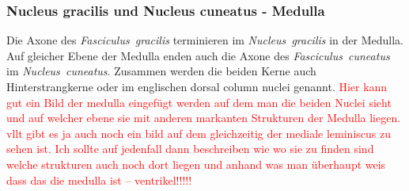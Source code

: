 \documentclass[12pt,a4paper,pdftex]{article}
\begin{document}
\subsubsection*{Nucleus gracilis und Nucleus cuneatus - Medulla}

Die Axone des \textit{Fasciculus~gracilis} terminieren im \textit{Nucleus~gracilis} in der Medulla. Auf gleicher Ebene der Medulla enden auch die Axone des \textit{Fasciculus~cuneatus} im \textit{Nucleus~cuneatus}. Zusammen werden die beiden Kerne auch Hinterstrangkerne oder im englischen dorsal column nuclei genannt. \textcolor{red}{Hier kann gut ein Bild der medulla eingefügt werden auf dem man die beiden Nuclei sieht und auf welcher ebene sie mit anderen markanten Strukturen der Medulla liegen. vllt gibt es ja auch noch ein bild auf dem gleichzeitig der mediale leminiscus zu sehen ist. Ich sollte auf jedenfall dann beschreiben wie wo sie zu finden sind welche strukturen auch noch dort liegen und anhand was man überhaupt weis dass das die medulla ist -- ventrikel!!!!!}
\end{document}
